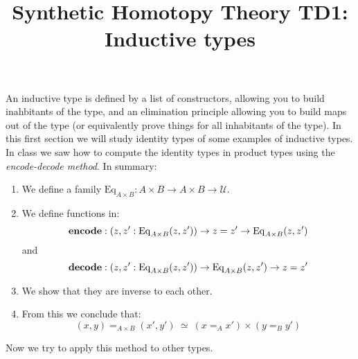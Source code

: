 \documentclass{article}[6pt]%
\title{Synthetic Homotopy Theory TD1: Inductive types}
\newcommand{\se}[1]{\medbreak \medbreak \section{#1}}
\newcommand{\sse}[1]{\medbreak \subsection{#1}}
\newcommand{\U}{{\mathcal U}}
\renewcommand{\r}{\rightarrow}
\newcommand{\zero}{{\bf 0}}
\newcommand{\Eq}{\mathrm{Eq}}
\newcommand{\encode}{\mathrm{\bf encode}}
\newcommand{\decode}{\mathrm{\bf decode}}
\begin{document}
\maketitle



An inductive type is defined by a list of constructors, allowing you to build inahbitants of the type, and an elimination principle allowing you to build maps out of the type (or equivalently prove things for all inhabitants of the type). In this first section we will study identity types of some examples of inductive types. In class we saw how to compute the identity types in product types using the \emph{encode-decode method}. In summary:

\begin{enumerate}
\item We define a family $\Eq_{A\times B} : A\times B \r A\times B \r \U$.
\item We define functions in:
\[\encode : (z,z':\Eq_{A\times B}(z,z')) \r z=z'\r \Eq_{A\times B}(z,z')\]
and
\[\decode : (z,z':\Eq_{A\times B}(z,z')) \r \Eq_{A\times B}(z,z') \r z=z'\]
\item We show that they are inverse to each other.
\item From this we conclude that:
\[(x,y)=_{A\times B}(x',y') \ \simeq \ (x=_Ax')\times (y=_By')\]
\end{enumerate}

Now we try to apply this method to other types.

\end{document}
